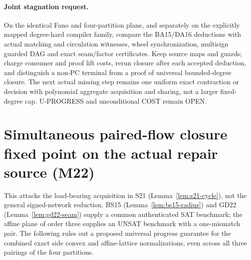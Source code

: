 \documentclass[11pt]{article}
\begin{document}
\paragraph{Joint stagnation request.}
On the identical Fano and four-partition plane, and separately on the explicitly mapped degree-hard compiler family, compare the BA15/DA16 deductions with actual matching and circulation witnesses, wheel synchronization, multisign guarded DAG and exact seam/factor certificates. Keep source maps and guards; charge consumer and proof lift costs, rerun closure after each accepted deduction, and distinguish a non-PC terminal from a proof of universal bounded-degree closure. The next actual missing step remains one uniform exact contraction or decision with polynomial aggregate acquisition and sharing, not a larger fixed-degree cap. U-PROGRESS and unconditional COST remain OPEN.


\section{Simultaneous paired-flow closure fixed point on the actual repair source (M22)}\label{sec:m22}
This attacks the load-bearing acquisition in S21 (Lemma~\ref{lem:s21-cycle}), not the general signed-network reduction. BS15 (Lemma~\ref{lem:bs15-radius}) and GD22 (Lemma~\ref{lem:gd22-seam}) supply a common authenticated SAT benchmark; the affine plane of order three supplies an UNSAT benchmark with a one-mismatch pair. The following rules out a proposed universal progress guarantee for the combined exact side convex and affine-lattice normalizations, even across all three pairings of the four partitions.
\end{document}
